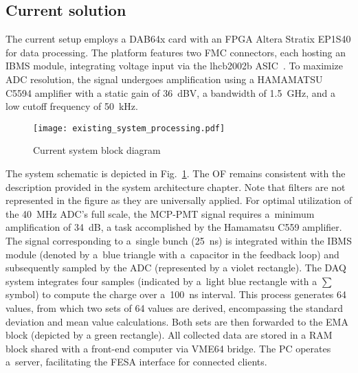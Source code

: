 \subsection{Current solution}
The current setup employs a DAB64x card with an FPGA Altera Stratix EP1S40 for
data processing. The platform features two FMC connectors, each hosting an IBMS
module, integrating voltage input via the lhcb2002b ASIC~\cite{lhcb_asic}. To
maximize ADC resolution, the signal undergoes amplification using a HAMAMATSU
C5594 amplifier with a static gain of \SI{36}{dBV}, a bandwidth of
\SI{1.5}{GHz}, and a low cutoff frequency of \SI{50}{kHz}.

\begin{figure}[!tbh]
    \centering
    \texttt{[image: existing\_system\_processing.pdf]}
    \caption{Current system block diagram}
    \label{fig:current_system_processing}
\end{figure}


The system schematic is depicted in Fig.~\ref{fig:current_system_processing}.
The OF remains consistent with the description provided
in the system architecture chapter. Note that filters are not represented in the
figure as they are universally applied. For optimal utilization of the \SI{40}{MHz}
ADC's full scale, the MCP-PMT signal requires a~minimum amplification of
\SI{34}{dB}, a task accomplished by the Hamamatsu C559
amplifier\cite{bsra_first_operation}.\\
The signal corresponding to a~single bunch (\SI{25}{ns})
is integrated within the IBMS module (denoted by a~blue triangle with a~capacitor in the feedback loop) and subsequently sampled by the ADC
(represented by a violet rectangle). The DAQ system integrates four samples
(indicated by a~light blue rectangle with a $\sum$ symbol) to compute the
charge over a~\SI{100}{ns} interval. This process generates 64 values, from
which two sets of 64 values are derived, encompassing the standard deviation
and mean value calculations. Both sets are then forwarded to the EMA block (depicted by a green rectangle). All collected data
are stored in a RAM block shared with a front-end computer via VME64 bridge. The PC operates a~server, facilitating the FESA
interface for connected clients.

